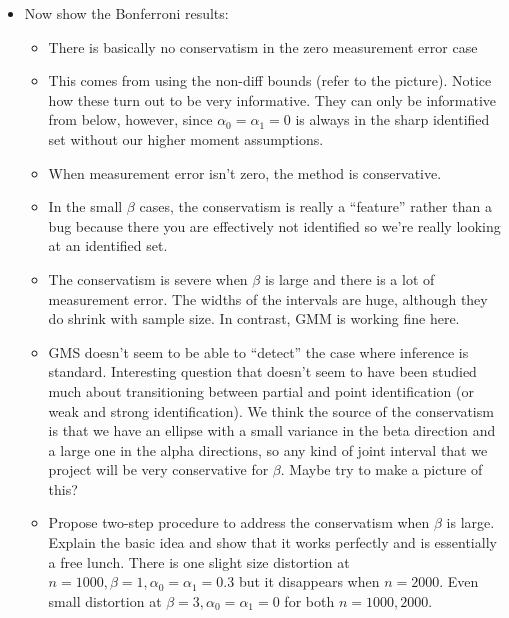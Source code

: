 \begin{itemize}
  \item Now show the Bonferroni results:
    \begin{itemize}
      \item There is basically no conservatism in the zero measurement error case
      \item This comes from using the non-diff bounds (refer to the picture). Notice how these turn out to be very informative. They can only be informative from below, however, since $\alpha_0 = \alpha_1 = 0$ is always in the sharp identified set without our higher moment assumptions.
      \item When measurement error isn't zero, the method is conservative. 
      \item In the small $\beta$ cases, the conservatism is really a ``feature'' rather than a bug because there you are effectively not identified so we're really looking at an identified set.
      \item The conservatism is severe when $\beta$ is large and there is a lot of measurement error.
        The widths of the intervals are huge, although they do shrink with sample size.
        In contrast, GMM is working fine here.
      \item GMS doesn't seem to be able to ``detect'' the case where inference is standard. 
        Interesting question that doesn't seem to have been studied much about transitioning between partial and point identification (or weak and strong identification).
        We think the source of the conservatism is that we have an ellipse with a small variance in the beta direction and a large one in the alpha directions, so any kind of joint interval that we project will be very conservative for $\beta$. Maybe try to make a picture of this?
      \item Propose two-step procedure to address the conservatism when $\beta$ is large. 
        Explain the basic idea and show that it works perfectly and is essentially a free lunch. 
        There is one slight size distortion at $n = 1000,\beta = 1, \alpha_0 = \alpha_1 = 0.3$ but it disappears when $n = 2000$. Even small distortion at $\beta = 3, \alpha_0 = \alpha_1 = 0$ for both $n =1000, 2000$.
    \end{itemize}
\end{itemize}
